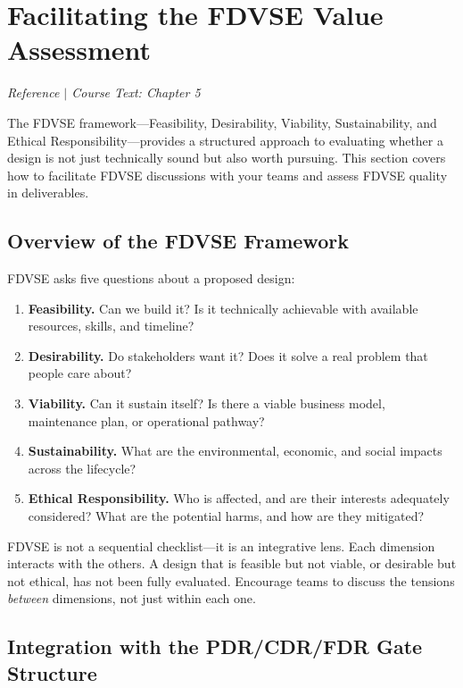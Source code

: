 \section{Facilitating the FDVSE Value Assessment}
\textit{Reference $|$ Course Text: Chapter 5}

The FDVSE framework---Feasibility, Desirability, Viability, Sustainability, and Ethical Responsibility---provides a structured approach to evaluating whether a design is not just technically sound but also worth pursuing. This section covers how to facilitate FDVSE discussions with your teams and assess FDVSE quality in deliverables.

\subsection{Overview of the FDVSE Framework}

FDVSE asks five questions about a proposed design:

\begin{enumerate}[nosep,leftmargin=1.5em]
\item \textbf{Feasibility.} Can we build it? Is it technically achievable with available resources, skills, and timeline?
\item \textbf{Desirability.} Do stakeholders want it? Does it solve a real problem that people care about?
\item \textbf{Viability.} Can it sustain itself? Is there a viable business model, maintenance plan, or operational pathway?
\item \textbf{Sustainability.} What are the environmental, economic, and social impacts across the lifecycle?
\item \textbf{Ethical Responsibility.} Who is affected, and are their interests adequately considered? What are the potential harms, and how are they mitigated?
\end{enumerate}

\begin{tipbox}
FDVSE is not a sequential checklist---it is an integrative lens. Each dimension interacts with the others. A design that is feasible but not viable, or desirable but not ethical, has not been fully evaluated. Encourage teams to discuss the tensions \emph{between} dimensions, not just within each one.
\end{tipbox}

\subsection{Integration with the PDR/CDR/FDR Gate Structure}

